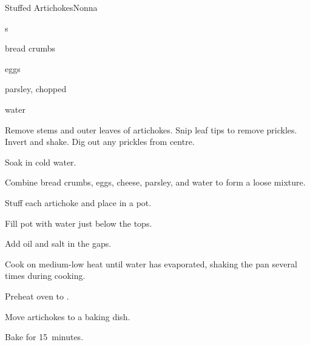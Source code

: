 \begin{recipe}{Stuffed Artichokes}{Nonna}{}

\begin{ingredients}
\item {}s
\item bread crumbs
\item eggs
\item {}
\item parsley, chopped
\item water
\end{ingredients}

\begin{directions}
\item Remove stems and outer leaves of artichokes. Snip leaf tips to remove prickles. Invert and shake. Dig out any prickles from centre.
\item Soak in cold water.
\item Combine bread crumbs, eggs, cheese, parsley, and water to form a loose mixture.
\item Stuff each artichoke and place in a pot.
\item Fill pot with water just below the tops.
\item Add oil and salt in the gaps.
\item Cook on medium-low heat until water has evaporated, shaking the pan several times during cooking.
\item Preheat oven to .
\item Move artichokes to a baking dish.
\item Bake for 15~minutes.
\end{directions}

\end{recipe}
